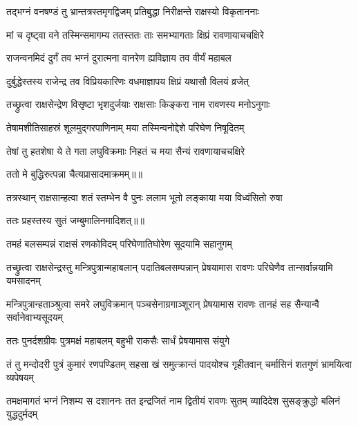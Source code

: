 \twolineshloka
{तद्भग्नं वनषण्डं तु भ्रान्तत्रस्तमृगद्विजम्}
{प्रतिबुद्धा निरीक्षन्ते राक्षस्यो विकृताननाः} %

\twolineshloka
{मां च दृष्ट्वा वने तस्मिन्समागम्य ततस्ततः}
{ताः समभ्यागताः क्षिप्रं रावणायाचचक्षिरे} %

\twolineshloka
{राजन्वनमिदं दुर्गं तव भग्नं दुरात्मना}
{वानरेण ह्यविज्ञाय तव वीर्यं महाबल} %

\twolineshloka
{दुर्बुद्धेस्तस्य राजेन्द्र तव विप्रियकारिणः}
{वधमाज्ञापय क्षिप्रं यथासौ विलयं व्रजेत्} %

\twolineshloka
{तच्छ्रुत्वा राक्षसेन्द्रेण विसृष्टा भृशदुर्जयाः}
{राक्षसाः किङ्करा नाम रावणस्य मनोऽनुगाः} %

\twolineshloka
{तेषामशीतिसाहस्रं शूलमुद्गरपाणिनाम्}
{मया तस्मिन्वनोद्देशे परिघेण निषूदितम्} %

\twolineshloka
{तेषां तु हतशेषा ये ते गता लघुविक्रमाः}
{निहतं च मया सैन्यं रावणायाचचक्षिरे} %

{ततो मे बुद्धिरुत्पन्ना चैत्यप्रासादमाक्रमम्॥॥} %

\addtocounter{shlokacount}{1}

\twolineshloka
{तत्रस्थान् राक्षसान्हत्वा शतं स्तम्भेन वै पुनः}
{ललाम भूतो लङ्काया मया विध्वंसितो रुषा} %

{ततः प्रहस्तस्य सुतं जम्बुमालिनमादिशत्॥॥} %

\addtocounter{shlokacount}{1}

\twolineshloka
{तमहं बलसम्पन्नं राक्षसं रणकोविदम्}
{परिघेणातिघोरेण सूदयामि सहानुगम्} %

\threelineshloka
{तच्छ्रुत्वा राक्षसेन्द्रस्तु मन्त्रिपुत्रान्महाबलान्}
{पदातिबलसम्पन्नान् प्रेषयामास रावणः}
{परिघेणैव तान्सर्वान्नयामि यमसादनम्} %

\threelineshloka
{मन्त्रिपुत्रान्हताञ्श्रुत्वा समरे लघुविक्रमान्}
{पञ्चसेनाग्रगाञ्शूरान् प्रेषयामास रावणः}
{तानहं सह सैन्यान्वै सर्वानेवाभ्यसूदयम्} %

\twolineshloka
{ततः पुनर्दशग्रीवः पुत्रमक्षं महाबलम्}
{बहुभी राकसैः सार्धं प्रेषयामास संयुगे} %

\threelineshloka
{तं तु मन्दोदरी पुत्रं कुमारं रणपण्डितम्}
{सहसा खं समुत्क्रान्तं पादयोश्च गृहीतवान्}
{चर्मासिनं शतगुणं भ्रामयित्वा व्यपेषयम्} %

\threelineshloka
{तमक्षमागतं भग्नं निशम्य स दशाननः}
{तत इन्द्रजितं नाम द्वितीयं रावणः सुतम्}
{व्यादिदेश सुसङ्क्रुद्धो बलिनं युद्धदुर्मदम्} %

